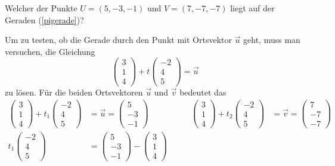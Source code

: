 \begin{beispiel} Welcher der Punkte $U=(5,-3,-1)$ und $V=(7,-7,-7)$
liegt auf der Geraden (\ref{pigerade})?

\smallskip

{\parindent 0pt Um zu testen},
ob die Gerade durch den Punkt mit Ortsvektor $\vec u$
geht, muss man versuchen, die Gleichung
\[
\begin{pmatrix}3\\1\\4 \end{pmatrix}
+t
\begin{pmatrix}-2\\4\\5\end{pmatrix}
=\vec u
\]
zu lösen.
Für die beiden Ortsvektoren $\vec u$ und $\vec v$
bedeutet das
\begin{align*}
\begin{pmatrix}3\\1\\4 \end{pmatrix}
+
t_1
\begin{pmatrix}-2\\4\\5\end{pmatrix}
&=
\vec{u}
=
\begin{pmatrix}5\\-3\\-1\end{pmatrix}
&
\qquad
\begin{pmatrix}3\\1\\4 \end{pmatrix}
+
t_2
\begin{pmatrix}-2\\4\\5\end{pmatrix}
&=
\vec{v}
=
\begin{pmatrix}7\\-7\\-7\end{pmatrix}
\\
t_1
\begin{pmatrix}-2\\4\\5\end{pmatrix}
&=
\begin{pmatrix}5\\-3\\-1\end{pmatrix}
-
\begin{pmatrix}3\\1\\4 \end{pmatrix}

\end{align*}
\end{beispiel}
